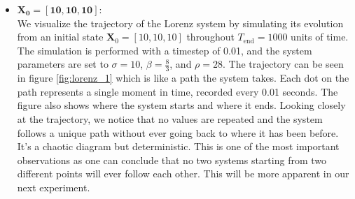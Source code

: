    \begin{itemize}
       \item  \textbf{$\mathbf{X_0=[10,10,10]}$}:\\
We visualize the trajectory of the Lorenz system by simulating its evolution from an initial state $\mathbf{X}_0 = [10, 10, 10]$ throughout $T_{\text{end}} = 1000$ units of time. The simulation is performed with a timestep of 0.01, and the system parameters are set to $\sigma = 10$, $\beta = \frac{8}{3}$, and $\rho = 28$. 
The trajectory can be seen in figure \ref{fig:lorenz_1} which is like a path the system takes. Each dot on the path represents a single moment in time, recorded every 0.01 seconds. The figure also shows where the system starts and where it ends. Looking closely at the trajectory, we notice that no values are repeated and the system follows a unique path without ever going back to where it has been before. It's a chaotic diagram but deterministic. This is one of the most important observations as one can conclude that no two systems starting from two different points will ever follow each other. This will be more apparent in our next experiment.


\end{itemize}
